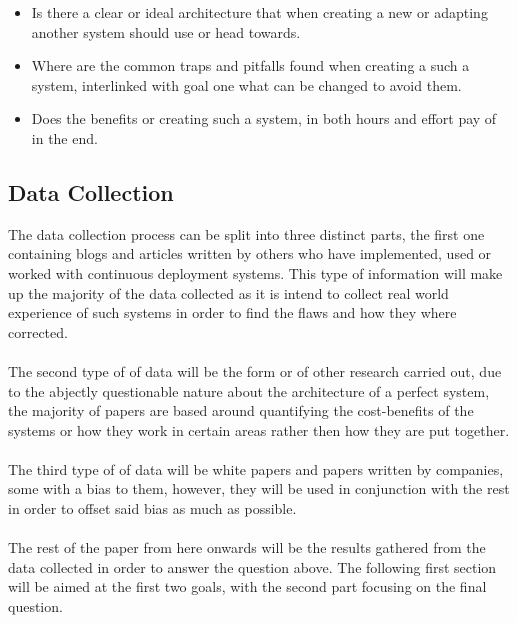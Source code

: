 \begin{itemize}
  \item Is there a clear or ideal architecture that when creating a new or adapting another system should use or head towards.\\
    \item Where are the common traps and pitfalls found when creating a such a system, interlinked  with goal one what can be changed to avoid them.\\
  \item Does the benefits or creating such a system, in both hours and effort pay of in the end. \\
\end{itemize}

\subsection{Data Collection}

The data collection process can be split into three distinct parts, the first one containing blogs and articles written by others who have implemented, used or worked with continuous deployment systems. This type of information will make up the majority of the data collected as it is intend to collect real world experience of such systems in order to find the flaws and how they where corrected.
\\\\
The second type of of data will be the form or of other research carried out, due to the abjectly questionable nature about the architecture of a perfect system, the majority of papers are based around quantifying the cost-benefits of the systems or how they work in certain areas rather then how they are put together. 
\\\\
The third type of of data will be white papers and papers written by companies, some with a bias to them, however, they will be used in conjunction with the rest in order to offset said bias as much as possible.
\\\\
The rest of the paper from here onwards will be the results gathered from the data collected in order to answer the question above. The following first section will be aimed at the first two goals, with the second part focusing on the final question.